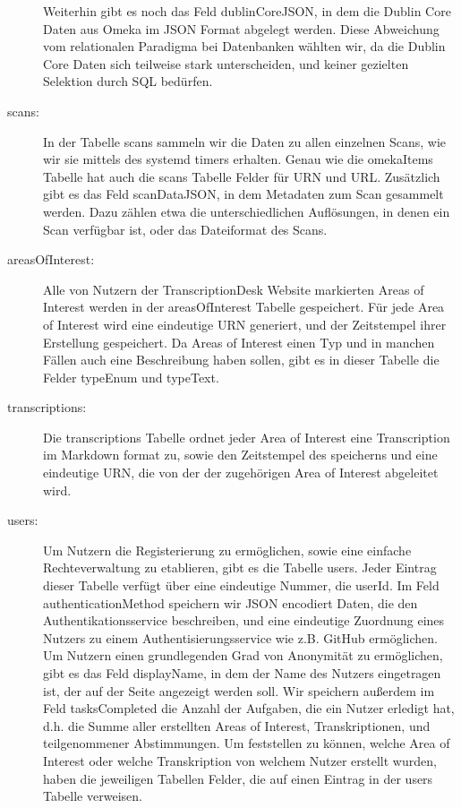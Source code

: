 \documentclass{article}
\begin{document}
\begin{description}
    Weiterhin gibt es noch das Feld dublinCoreJSON,
    in dem die Dublin Core Daten aus Omeka im JSON Format abgelegt werden.
    Diese Abweichung vom relationalen Paradigma bei Datenbanken wählten wir,
    da die Dublin Core Daten sich teilweise stark unterscheiden,
    und keiner gezielten Selektion durch SQL bedürfen.
\item[scans:]
    In der Tabelle scans sammeln wir die Daten zu allen einzelnen Scans,
    wie wir sie mittels des systemd timers erhalten.
    Genau wie die omekaItems Tabelle hat auch die scans Tabelle Felder für URN und URL.
    Zusätzlich gibt es das Feld scanDataJSON,
    in dem Metadaten zum Scan gesammelt werden.
    Dazu zählen etwa die unterschiedlichen Auflösungen,
    in denen ein Scan verfügbar ist,
    oder das Dateiformat des Scans.
\item[areasOfInterest:]
    Alle von Nutzern der TranscriptionDesk Website markierten Areas of Interest werden in der areasOfInterest Tabelle gespeichert.
    Für jede Area of Interest wird eine eindeutige URN generiert,
    und der Zeitstempel ihrer Erstellung gespeichert.
    Da Areas of Interest einen Typ und in manchen Fällen auch eine Beschreibung haben sollen,
    gibt es in dieser Tabelle die Felder typeEnum und typeText.
\item[transcriptions:]
    Die transcriptions Tabelle ordnet jeder Area of Interest eine Transcription im Markdown format zu,
    sowie den Zeitstempel des speicherns und eine eindeutige URN, die von der der zugehörigen Area of Interest abgeleitet wird.
\item[users:]
    Um Nutzern die Registerierung zu ermöglichen,
    sowie eine einfache Rechteverwaltung zu etablieren,
    gibt es die Tabelle users.
    Jeder Eintrag dieser Tabelle verfügt über eine eindeutige Nummer, die userId.
    Im Feld authenticationMethod speichern wir JSON encodiert Daten,
    die den Authentikationsservice beschreiben,
    und eine eindeutige Zuordnung eines Nutzers zu einem Authentisierungsservice wie z.B. GitHub ermöglichen.
    Um Nutzern einen grundlegenden Grad von Anonymität zu ermöglichen,
    gibt es das Feld displayName,
    in dem der Name des Nutzers eingetragen ist,
    der auf der Seite angezeigt werden soll.
    Wir speichern außerdem im Feld tasksCompleted
    die Anzahl der Aufgaben, die ein Nutzer erledigt hat,
    d.h. die Summe aller erstellten Areas of Interest, Transkriptionen,
    und teilgenommener Abstimmungen.
    Um feststellen zu können, welche Area of Interest oder welche Transkription
    von welchem Nutzer erstellt wurden,
    haben die jeweiligen Tabellen Felder,
    die auf einen Eintrag in der users Tabelle verweisen.
\end{description}
\end{document}
